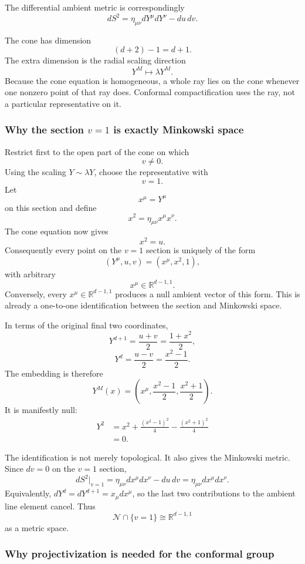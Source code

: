 \documentclass[
  10pt,
  a4paper,
  openany]{book}
\begin{document}
The differential ambient metric is correspondingly \[
dS^2
=
\eta_{\mu\nu}dY^\mu dY^\nu
-du\,dv.
\]

The cone has dimension \[
(d+2)-1=d+1.
\] The extra dimension is the radial scaling direction \[
Y^M\longmapsto\lambda Y^M.
\] Because the cone equation is homogeneous, a whole ray lies on the
cone whenever one nonzero point of that ray does. Conformal
compactification uses the ray, not a particular representative on it.

\subsubsection{\texorpdfstring{Why the section \(v=1\) is exactly
Minkowski
space}{Why the section v=1 is exactly Minkowski space}}\label{why-the-section-v1-is-exactly-minkowski-space}

Restrict first to the open part of the cone on which \[
v\neq0.
\] Using the scaling \(Y\sim\lambda Y\), choose the representative with
\[
v=1.
\] Let \[
x^\mu=Y^\mu
\] on this section and define \[
x^2
=\eta_{\mu\nu}x^\mu x^\nu.
\] The cone equation now gives \[
x^2=u.
\] Consequently every point on the \(v=1\) section is uniquely of the
form \[
\left(
Y^\mu,u,v
\right)
=
\left(
x^\mu,x^2,1
\right),
\] with arbitrary \[
x^\mu\in\mathbb R^{d-1,1}.
\] Conversely, every \(x^\mu\in\mathbb R^{d-1,1}\) produces a null
ambient vector of this form. This is already a one-to-one identification
between the section and Minkowski space.

In terms of the original final two coordinates, \[
Y^{d+1}
=\frac{u+v}{2}
=\frac{1+x^2}{2},
\] \[
Y^d
=\frac{u-v}{2}
=\frac{x^2-1}{2}.
\] The embedding is therefore \[
\boxed{
Y^M(x)
=
\left(
x^\mu,
\frac{x^2-1}{2},
\frac{x^2+1}{2}
\right)
}.
\] It is manifestly null: \[
\begin{aligned}
Y^2
&=
x^2
+\frac{(x^2-1)^2}{4}
-\frac{(x^2+1)^2}{4}\\
&=0.
\end{aligned}
\]

The identification is not merely topological. It also gives the
Minkowski metric. Since \(dv=0\) on the \(v=1\) section, \[
dS^2\big|_{v=1}
=
\eta_{\mu\nu}dx^\mu dx^\nu-du\,dv
=
\eta_{\mu\nu}dx^\mu dx^\nu.
\] Equivalently, \(dY^d=dY^{d+1}=x_\mu dx^\mu\), so the last two
contributions to the ambient line element cancel. Thus \[
\boxed{
\mathcal N\cap\{v=1\}
\cong
\mathbb R^{d-1,1}
}
\] as a metric space.

\subsubsection{Why projectivization is needed for the conformal
group}\label{why-projectivization-is-needed-for-the-conformal-group}
\end{document}
